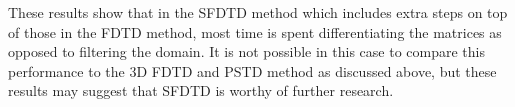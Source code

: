 These results show that in the SFDTD method which includes extra steps on top of those in the FDTD method, most time is spent differentiating the matrices as opposed to filtering the domain. It is not possible in this case to compare this performance to the 3D FDTD and PSTD method as discussed above, but these results may suggest that SFDTD is worthy of further research.